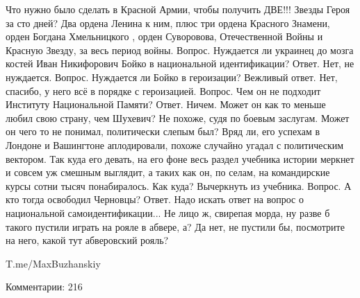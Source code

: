 Что нужно было сделать в Красной Армии, чтобы получить ДВЕ!!! Звезды Героя за сто дней?
Два ордена Ленина к ним, плюс три ордена Красного Знамени, орден Богдана Хмельницкого , орден Суворовова, Отечественной Войны и Красную Звезду, за весь период войны.
Вопрос.
Нуждается ли украинец до мозга костей Иван Никифорович Бойко в национальной идентификации?
Ответ.
Нет, не нуждается.
Вопрос.
Нуждается ли Бойко в героизации?
Вежливый ответ.
Нет, спасибо, у него всё в порядке с героизацией.
Вопрос.
Чем он не подходит Институту Национальной Памяти?
Ответ.
Ничем.
Может он как то меньше любил свою страну, чем Шухевич?
Не похоже, судя по боевым заслугам.
Может он чего то не понимал, политически слепым был?
Вряд ли, его успехам в Лондоне и Вашингтоне аплодировали, похоже случайно угадал с политическим вектором.
Так куда его девать, на его фоне весь раздел учебника истории меркнет и совсем уж смешным выглядит, а таких как он, по селам, на командирские курсы сотни тысяч понабиралось.
Как куда?
Вычеркнуть из учебника.
Вопрос.
А кто тогда освободил Черновцы?
Ответ.
Надо искать ответ на вопрос о национальной самоидентификации...
Не лицо ж, свирепая морда, ну разве б такого пустили играть на рояле в абвере, а?
Да нет, не пустили бы, посмотрите на него, какой тут абверовский рояль?

T.me/MaxBuzhanskiy

Комментарии: 216

